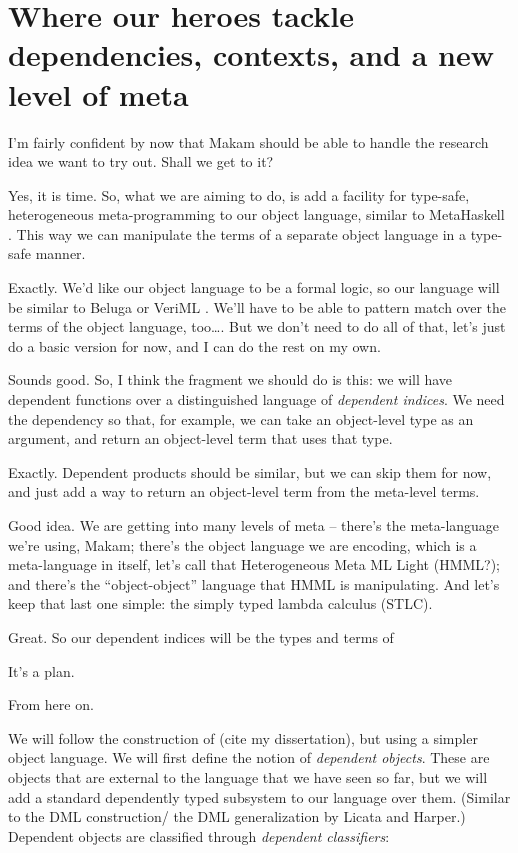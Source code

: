 \section{Where our heroes tackle dependencies, contexts, and a new level
of
meta}\label{where-our-heroes-tackle-dependencies-contexts-and-a-new-level-of-meta}

\heroSTUDENT{} I'm fairly confident by now that Makam should be able to handle
the research idea we want to try out. Shall we get to it?

\heroADVISOR{} Yes, it is time. So, what we are aiming to do, is add a
facility for type-safe, heterogeneous meta-programming to our object
language, similar to MetaHaskell \citep{mainland2012explicitly}. This
way we can manipulate the terms of a separate object language in a
type-safe manner.

\heroSTUDENT{} Exactly. We'd like our object language to be a formal logic, so
our language will be similar to Beluga \citep{pientka2010beluga} or
VeriML \citep{stampoulis2013veriml}. We'll have to be able to pattern
match over the terms of the object language, too\ldots{}. But we don't
need to do all of that, let's just do a basic version for now, and I can
do the rest on my own.

\heroADVISOR{} Sounds good. So, I think the fragment we should do is this: we
will have dependent functions over a distinguished language of
\emph{dependent indices}. We need the dependency so that, for example,
we can take an object-level type as an argument, and return an
object-level term that uses that type.

\heroSTUDENT{} Exactly. Dependent products should be similar, but we can skip
them for now, and just add a way to return an object-level term from the
meta-level terms.

\heroADVISOR{} Good idea. We are getting into many levels of meta -- there's
the meta-language we're using, Makam; there's the object language we are
encoding, which is a meta-language in itself, let's call that
Heterogeneous Meta ML Light (HMML?); and there's the ``object-object''
language that HMML is manipulating. And let's keep that last one simple:
the simply typed lambda calculus (STLC).

\heroSTUDENT{} Great. So our dependent indices will be the types and terms of
\heroSTLC{}

\heroADVISOR{} It's a plan.

\TODO{} From here on.

We will follow the construction of (cite my dissertation), but using a
simpler object language. We will first define the notion of
\emph{dependent objects}. These are objects that are external to the
language that we have seen so far, but we will add a standard
dependently typed subsystem to our language over them. (Similar to the
DML construction/ the DML generalization by Licata and Harper.)
Dependent objects are classified through \emph{dependent classifiers}:

